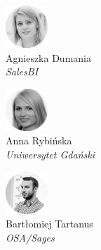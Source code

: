 \begin{minipage}[t]{0.33\textwidth}
	\center     
    \includegraphics[width=60px]{img/people/czarno_biale/agnieszka-crop.png}   \\
    Agnieszka Dumania \\
    \textit{SalesBI}
\end{minipage}
\begin{minipage}[t]{0.33\textwidth}
	\center 
    \includegraphics[width=60px]{img/people/czarno_biale/anna-crop.png}    \\
   Anna Rybińska \\
	\textit{Uniwersytet Gdański} 
\end{minipage}
\begin{minipage}[t]{0.33\textwidth}
	\center     
    \includegraphics[width=60px]{img/people/czarno_biale/bartek-crop.png}   \\
    Bartłomiej Tartanus \\
	\textit{OSA/Sages}
\end{minipage}

